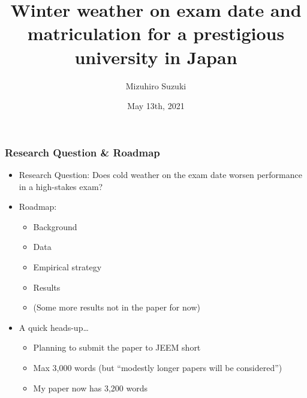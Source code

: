 \documentclass[10pt, pdfmx,hiresbb]{beamer}
\title[Temperature and Exam]{Winter weather on exam date and matriculation for a prestigious university in Japan}
\author[Suzuki]{Mizuhiro Suzuki}
\date{May 13th, 2021}
\begin{document}
\begin{frame}
\titlepage
\end{frame}

\begin{frame}\frametitle{Research Question \& Roadmap}
  \begin{itemize}
    \item Research Question: Does cold weather on the exam date worsen performance in a high-stakes exam?
    \item Roadmap:
      \begin{itemize}
        \item Background
        \item Data
        \item Empirical strategy
        \item Results
        \item (Some more results not in the paper for now)
      \end{itemize}
    \item A quick heads-up\dots
      \begin{itemize}
        \item Planning to submit the paper to JEEM short 
        \item Max 3,000 words (but ``modestly longer papers will be considered'')
        \item My paper now has 3,200 words
      \end{itemize}
  \end{itemize}
\end{frame}
\end{document}
